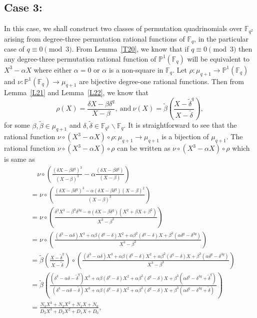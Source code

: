 \documentclass[12pt]{amsart}
\numberwithin{equation}{section}
\theoremstyle{definition}
\newcommand{\F}{\mathbb F}
\newcommand{\bP}{\mathbb P}
\begin{document}
\subsection*{Case 3:}
 In this case, we shall construct two classes of permutation quadrinomials over $\F_{q^2}$ arising from degree-three permutation rational functions of $\F_q$, in the particular case of $q\equiv 0 \pmod 3$. From Lemma~\ref{T20}, we know that if $q\equiv 0 \pmod 3$ then any degree-three permutation rational function of $\bP^1(\F_q)$ will be equivalent to $X^3-\alpha X$ where either $\alpha =0$ or $\alpha$ is a non-square in $\F_q$. Let $\rho : \mu_{q+1} \rightarrow \bP^1(\F_q)$ and ${\nu} : \bP^1(\F_q) \rightarrow \mu_{q+1}$ are bijective degree-one rational functions. Then from Lemma~\ref{L21} and Lemma~\ref{L22}, we know that
 \[
  \rho(X) = \frac{\delta X -\beta \delta^q}{X-\beta},
 ~\mbox{and}~
  {\nu}(X) = {\tilde \beta} \left(\frac{X -{\tilde \delta}^q}{X- {\tilde \delta}}\right),
 \]
 for some $\beta, {\tilde \beta} \in \mu_{q+1}$ and $\delta, {\tilde \delta} \in \F_{q^2} \backslash \F_q$. It is straightforward to see that the rational function ${\nu} \circ (X^3 -\alpha X) \circ \rho : \mu_{q+1} \rightarrow \mu_{q+1}$ is a bijection of $\mu_{q+1}$. The rational function ${\nu} \circ (X^3 -\alpha X) \circ \rho$  can be written as ${\nu} \circ (X^3 -\alpha X) \circ \rho$ which is same as
 \begin{equation*}
  \begin{split}
  & \quad {\nu} \circ \left(\frac{(\delta X -\beta \delta^q)^3}{(X-\beta)^3} - \alpha \frac{(\delta X -\beta \delta^q)}{(X-\beta)} \right) \\
   &= {\nu} \circ \left(\frac{(\delta X -\beta \delta^q)^3-\alpha(\delta X -\beta \delta^q)(X-\beta)^2}{(X-\beta)^3} \right) \\
   &= {\nu} \circ \left(\frac{\delta^3 X^3 -\beta^3 \delta^{3q}-\alpha(\delta X -\beta \delta^q)(X^2+\beta X +\beta^2)}{X^3-\beta^3} \right) \\
   &= {\nu} \circ \left(\frac{(\delta^3-\alpha \delta) X^3+ \alpha \beta (\delta^q -\delta)X^2+\alpha \beta^2 (\delta^q -\delta)X +\beta^3 (\alpha \delta^q- \delta^{3q})}{X^3-\beta^3} \right) \\
   &= {\tilde \beta} \left(\frac{X -{\tilde \delta}^q}{X- {\tilde \delta}}\right) \circ \left(\frac{(\delta^3-\alpha \delta) X^3+ \alpha \beta (\delta^q -\delta)X^2+\alpha \beta^2 (\delta^q -\delta)X +\beta^3 (\alpha \delta^q- \delta^{3q})}{X^3-\beta^3} \right) \\
   &= {\tilde \beta} \left(\frac{(\delta^3-\alpha \delta - {\tilde \delta}^q) X^3+ \alpha \beta (\delta^q -\delta)X^2+\alpha \beta^2 (\delta^q -\delta)X +\beta^3 (\alpha \delta^q- \delta^{3q}+ {\tilde \delta}^q)}{(\delta^3-\alpha \delta -{\tilde \delta}) X^3+ \alpha \beta (\delta^q -\delta)X^2+\alpha \beta^2 (\delta^q -\delta)X +\beta^3 (\alpha \delta^q- \delta^{3q}+{\tilde \delta})}\right) \\
   &= \frac{N_3X^3+N_2X^2+N_1X+N_0}{D_3X^3+D_2X^2+D_1X+D_0},
  \end{split}
 \end{equation*}
\end{document}
